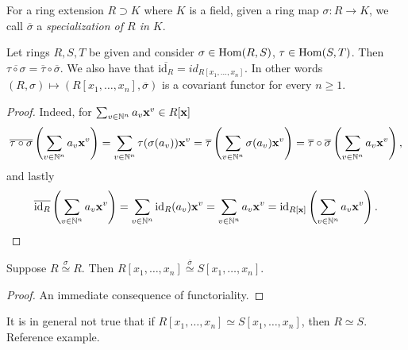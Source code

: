 \begin{definition}
    For a ring extension $R\supset K$ where $K$ is a field, given a ring map $\sigma : R \rightarrow K$, we call $\overline{\sigma}$ a \textit{specialization of $R$ in $K$}.
\end{definition}
\begin{lemma}
    Let rings $R,S,T$ be given and consider $\sigma\in \mathrm{Hom}(R,S)$, $\tau\in \mathrm{Hom}(S,T)$. Then $\overline{\tau\circ \sigma} = \overline{\tau} \circ \overline{\sigma}$. We also have that $\overline{\text{id}_R}=\textit{id}_{R[x_1,\dots,x_n]}$. In other words $(R,\sigma)\mapsto (R[x_1,\dots,x_n],\overline{\sigma})$ is a covariant functor for every $n\geq 1$.  
\end{lemma}
\begin{proof}
    Indeed, for $\sum_{v\in \mathbb{N}^n} a_v\mathbf{x}^v\in R[\mathbf{x}]$
    \begin{align*}\overline{\tau \circ \sigma}\left(\sum_{v\in \mathbb{N}^n} a_v\mathbf{x}^v\right) = \sum_{v\in \mathbb{N}^n} \tau(\sigma(a_v))\mathbf{x}^v = \overline{\tau}\left(\sum_{v\in\mathbb{N}^n}\sigma(a_v)\mathbf{x}^v \right) = \overline{\tau}\circ\overline{\sigma}\left(\sum_{v\in\mathbb{N}^n}a_v\mathbf{x}^v \right),\end{align*}
    and lastly
    $$\overline{\text{id}_R}\left(\sum_{v\in \mathbb{N}^n} a_v\mathbf{x}^v \right) = \sum_{v\in \mathbb{N}^n} \text{id}_{R}(a_v)\mathbf{x}^v=\sum_{v\in \mathbb{N}^n} a_v\mathbf{x}^v= \text{id}_{R[\mathbf{x}]}\left( \sum_{v\in \mathbb{N}^n} a_v\mathbf{x}^v\right).$$
\end{proof}
\begin{corollary}\label{RingsIsomorphicImpliesPolynomialRingsIsomorphic}
    Suppose $R\overset{\sigma}{\simeq}R$. Then $R[x_1,\dots,x_n]\overset{\overline{\sigma}}{\simeq} S[x_1,\dots,x_n]$.
\end{corollary}
\begin{proof}
    An immediate consequence of functoriality. 
\end{proof}
\begin{example}
    It is in general not true that if $R[x_1,\dots,x_n]\simeq S[x_1,\dots,x_n]$, then $R\simeq S$. {\LARGE Reference example}.
\end{example}
